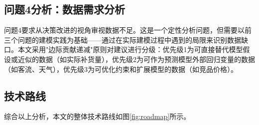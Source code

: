 \documentclass[12pt,a4paper]{ctexart}
\begin{document}
\subsection{问题4分析：数据需求分析}

问题4要求从决策改进的视角审视数据不足。这是一个定性分析问题，但需要以前三个问题的建模实践为基础——通过在实际建模过程中遇到的局限来识别数据缺口。本文采用"边际贡献递减"原则对建议进行分级：优先级1为可直接替代模型假设或近似的数据（如实际补货量），优先级2为可作为预测模型外部回归变量的数据（如客流、天气），优先级3为可优化约束和扩展模型的数据（如竞品价格）。

\subsection{技术路线}

综合以上分析，本文的整体技术路线如图\ref{fig:roadmap}所示。
\end{document}
